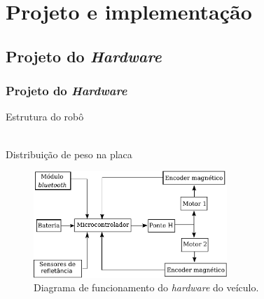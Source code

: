 \section{Projeto e implementação}

\subsection{Projeto do \textit{Hardware}}

\begin{frame}
\frametitle{Projeto do \textit{Hardware}}

Estrutura do robô \\~

Distribuição de peso na placa


\begin{figure}[th]
	\centering
	\captionsetup{width=0.65\textwidth,font=footnotesize,textfont=bf}
	\includegraphics[width=0.65\textwidth,keepaspectratio]{Figuras/DiagramaHW.pdf}
	\caption{Diagrama de funcionamento do \textit{hardware} do veículo.\label{fig:diagEl}}
\end{figure}

\end{frame}


